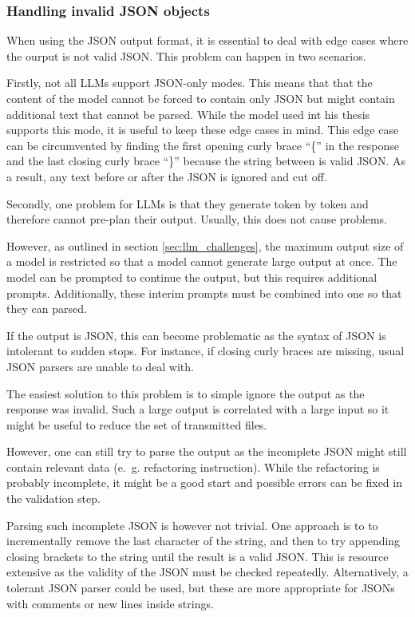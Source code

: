 \subsubsection{Handling invalid \ac{JSON} objects}

When using the \ac{JSON} output format, it is essential to deal with edge cases where the ourput is not valid \ac{JSON}. This problem can happen in two scenarios.

Firstly, not all \acp{LLM} support \ac{JSON}-only modes. This means that that the content of the model cannot be forced to contain only \ac{JSON} but might contain additional text that cannot be parsed. While the model used int his thesis supports this mode, it is useful to keep these edge cases in mind. This edge case can be circumvented by finding the first opening curly brace \enquote{\{} in the response and the last closing curly brace \enquote{\}} because the string between is valid \ac{JSON}. As a result, any text before or after the \ac{JSON} is ignored and cut off. 

Secondly, one problem for \acp{LLM} is that they generate token by token and therefore cannot pre-plan their output. Usually, this does not cause problems. 

However, as outlined in section \ref{sec:llm_challenges}, the maximum output size of a model is restricted so that a model cannot generate large output at once. The model can be prompted to continue the output, but this requires additional prompts. Additionally, these interim prompts must be combined into one so that they can parsed.

If the output is \ac{JSON}, this can become problematic as the syntax of \ac{JSON} is intolerant to sudden stops. For instance, if closing curly braces  are missing, usual \ac{JSON} parsers are unable to deal with. 

The easiest solution to this problem is to simple ignore the output as the response was invalid. Such a large output is correlated with a large input so it might be useful to reduce the set of transmitted files. 

However,  one can still try to parse the output as the incomplete \ac{JSON} might still contain relevant data (e.~g. refactoring instruction). While the refactoring is probably incomplete, it might be a good start and possible errors can be fixed in the validation step.

Parsing such incomplete \ac{JSON} is however not trivial. One approach is to to incrementally remove the last character of the string, and then to try appending closing brackets to the string until the result is a valid \ac{JSON}. This is resource extensive as the validity of the \ac{JSON} must be checked repeatedly. Alternatively, a tolerant \ac{JSON} parser could be used, but these are more appropriate for \acp{JSON} with comments or new lines inside strings. 



